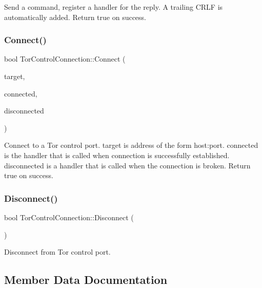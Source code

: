 Send a command, register a handler for the reply. A trailing C\+R\+LF is automatically added. Return true on success. \mbox{\label{class_tor_control_connection_a36b6359caf9a304efe310b9b7141a939}} 
\subsubsection{\texorpdfstring{Connect()}{Connect()}}
{\footnotesize\ttfamily bool Tor\+Control\+Connection\+::\+Connect (\begin{DoxyParamCaption}\item[{const std\+::string \&}]{target,  }\item[{const Connection\+CB \&}]{connected,  }\item[{const Connection\+CB \&}]{disconnected }\end{DoxyParamCaption})}

Connect to a Tor control port. target is address of the form host\+:port. connected is the handler that is called when connection is successfully established. disconnected is a handler that is called when the connection is broken. Return true on success. \mbox{\label{class_tor_control_connection_addb42114063641eab12be2fc39b859d5}} 
\subsubsection{\texorpdfstring{Disconnect()}{Disconnect()}}
{\footnotesize\ttfamily bool Tor\+Control\+Connection\+::\+Disconnect (\begin{DoxyParamCaption}{ }\end{DoxyParamCaption})}

Disconnect from Tor control port. 

\subsection{Member Data Documentation}
\mbox{\label{class_tor_control_connection_a23c206776020bd925c2da41e840cc08a}} 
